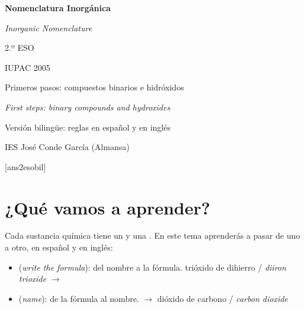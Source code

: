 \documentclass[12pt]{article}
\theoremstyle{mygreennumbox}
\newcommand{\en}[1]{\textit{#1}}
\begin{document}
\begin{titlepage}
    \vspace*{5cm}
    \begin{center}
        {\Huge{ \bfseries Nomenclatura Inorgánica}}\par\medskip
        {\LARGE\itshape Inorganic Nomenclature}
    \end{center}
    \vspace*{2cm}
    \begin{center}
        {\huge  2.º ESO}\par\bigskip
        {\huge  IUPAC 2005}\par\medskip
        {\Large Primeros pasos: compuestos binarios e hidróxidos}\par\smallskip
        {\Large\itshape First steps: binary compounds and hydroxides}\par\bigskip
        {\large Versión bilingüe: reglas en español y en inglés}
    \end{center}
    \vspace*{4cm}
    \begin{center}
        {\Large IES José Conde García (Almansa)}
    \end{center}
\end{titlepage}

\tableofcontents

\newpage

[ans2esobil]

\section{¿Qué vamos a aprender?}

Cada sustancia química tiene un  y una . En este tema aprenderás a pasar de uno a otro, en español y en inglés:

\begin{itemize}
    \item {} (\en{write the formula}): del nombre a la fórmula. \quad trióxido de dihierro / \en{diiron trioxide} \(\to\) 
    \item {} (\en{name}): de la fórmula al nombre. \quad {} \(\to\) dióxido de carbono / \en{carbon dioxide}
\end{itemize}
\end{document}
